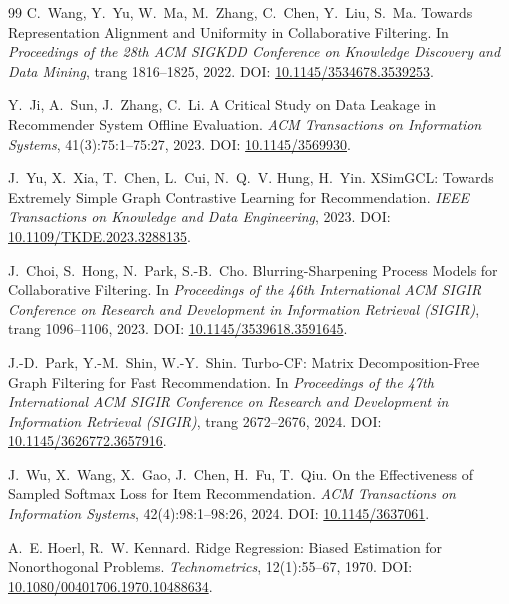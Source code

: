 \begin{thebibliography}{99}
C.~Wang, Y.~Yu, W.~Ma, M.~Zhang, C.~Chen, Y.~Liu, S.~Ma.
\newblock Towards Representation Alignment and Uniformity in Collaborative Filtering.
\newblock In \emph{Proceedings of the 28th ACM SIGKDD Conference on Knowledge Discovery and Data Mining}, trang 1816--1825, 2022.
\newblock DOI: \href{https://doi.org/10.1145/3534678.3539253}{10.1145/3534678.3539253}.

Y.~Ji, A.~Sun, J.~Zhang, C.~Li.
\newblock A Critical Study on Data Leakage in Recommender System Offline Evaluation.
\newblock \emph{ACM Transactions on Information Systems}, 41(3):75:1--75:27, 2023.
\newblock DOI: \href{https://doi.org/10.1145/3569930}{10.1145/3569930}.

J.~Yu, X.~Xia, T.~Chen, L.~Cui, N.~Q.~V. Hung, H.~Yin.
\newblock XSimGCL: Towards Extremely Simple Graph Contrastive Learning for Recommendation.
\newblock \emph{IEEE Transactions on Knowledge and Data Engineering}, 2023.
\newblock DOI: \href{https://doi.org/10.1109/TKDE.2023.3288135}{10.1109/TKDE.2023.3288135}.

J.~Choi, S.~Hong, N.~Park, S.-B.~Cho.
\newblock Blurring-Sharpening Process Models for Collaborative Filtering.
\newblock In \emph{Proceedings of the 46th International ACM SIGIR Conference on Research and Development in Information Retrieval (SIGIR)}, trang 1096--1106, 2023.
\newblock DOI: \href{https://doi.org/10.1145/3539618.3591645}{10.1145/3539618.3591645}.

J.-D.~Park, Y.-M.~Shin, W.-Y.~Shin.
\newblock Turbo-CF: Matrix Decomposition-Free Graph Filtering for Fast Recommendation.
\newblock In \emph{Proceedings of the 47th International ACM SIGIR Conference on Research and Development in Information Retrieval (SIGIR)}, trang 2672--2676, 2024.
\newblock DOI: \href{https://doi.org/10.1145/3626772.3657916}{10.1145/3626772.3657916}.

J.~Wu, X.~Wang, X.~Gao, J.~Chen, H.~Fu, T.~Qiu.
\newblock On the Effectiveness of Sampled Softmax Loss for Item Recommendation.
\newblock \emph{ACM Transactions on Information Systems}, 42(4):98:1--98:26, 2024.
\newblock DOI: \href{https://doi.org/10.1145/3637061}{10.1145/3637061}.

A.~E. Hoerl, R.~W. Kennard.
\newblock Ridge Regression: Biased Estimation for Nonorthogonal Problems.
\newblock \emph{Technometrics}, 12(1):55--67, 1970.
\newblock DOI: \href{https://doi.org/10.1080/00401706.1970.10488634}{10.1080/00401706.1970.10488634}.


\end{thebibliography}
